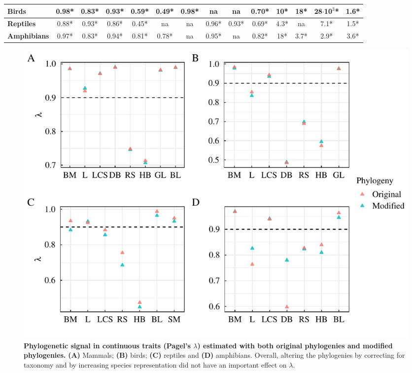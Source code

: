 \begin{table}[h!]
\begin{center}
\begin{tabular}{|l|c|c|c|c|c|c|c|c|c|c|c|c|c|}
\textbf{Birds}                                        & 0.98*           & 0.83*        & 0.93*          & 0.59*         & 0.49*         & 0.98*         & na            & na            & 0.70*         & 10*                   & 18*                   & 28$\cdot$10$^3$*           & 1.6*                 \\ \hline
\textbf{Reptiles}                                     & 0.88*          & 0.93*        & 0.86*          & 0.45*         & na            & na            & 0.96*         & 0.93*         & 0.69*         & 4.3*                  & na                    & 7.1*                       & 1.5*                 \\ \hline
\textbf{Amphibians}                                   & 0.97*          & 0.83*        & 0.94*          & 0.81*         & 0.78*         & na            & 0.95*         & na            & 0.82*         & 18*                   & 3.7*                  & 2.9*                       & 3.6*                 \\ \hline
\end{tabular}
\end{center}
\end{table}


\begin{figure}[h!]
\centering
\includegraphics[scale=0.65]{figures/chapter2/Phylosignal/Continuous}
\caption[Phylogenetic signal in continuous traits (Pagel's $\lambda$) estimated with both original phylogenies and modified phylogenies]{\textbf{Phylogenetic signal in continuous traits (Pagel's $\lambda$) estimated with both original phylogenies and modified phylogenies.} \textbf{(A)} Mammals; \textbf{(B)} birds; \textbf{(C)} reptiles and \textbf{(D)} amphibians. Overall, altering the phylogenies by correcting for taxonomy and by increasing species representation did not have an important effect on $\lambda$.}
\label{signalcontinuous}
\end{figure}

